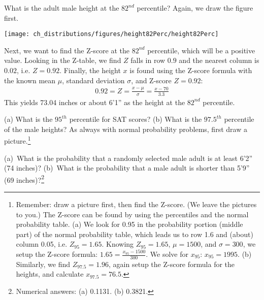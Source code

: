 \begin{example}{What is the adult male height at the $82^{nd}$ percentile?}
Again, we draw the figure first.\textC{\vspace{-3mm}}
\begin{center}
\texttt{[image: ch\_distributions/figures/height82Perc/height82Perc]}\textC{\vspace{-1mm}}
\end{center}
Next, we want to find the Z-score at the $82^{nd}$ percentile, which will be a positive value. Looking in the Z-table, we find $Z$ falls in row $0.9$ and the nearest column is $0.02$, i.e. $Z=0.92$. Finally, the height $x$ is found using the Z-score formula with the known mean $\mu$, standard deviation $\sigma$, and Z-score $Z=0.92$:
\begin{eqnarray*}
0.92 = Z = \frac{x-\mu}{\sigma} = \frac{x - 70}{3.3}
\end{eqnarray*}
This yields 73.04 inches or about 6'1'' as the height at the $82^{nd}$ percentile.
\end{example}

\begin{exercise}
(a) What is the $95^{th}$ percentile for SAT scores? (b) What is the $97.5^{th}$ percentile of the male heights? As always with normal probability problems, first draw a picture.\footnote{Remember: draw a picture first, then find the Z-score. (We leave the pictures to you.) The Z-score can be found by using the percentiles and the normal probability table. (a) We look for 0.95 in the probability portion (middle part) of the normal probability table, which leads us to row 1.6 and (about) column 0.05, i.e. $Z_{95}=1.65$. Knowing $Z_{95}=1.65$, $\mu = 1500$, and $\sigma = 300$, we setup the Z-score formula: $1.65 = \frac{x_{95} - 1500}{300}$. We solve for $x_{95}$: $x_{95} = 1995$. (b) Similarly, we find $Z_{97.5} = 1.96$, again setup the Z-score formula for the heights, and calculate $x_{97.5} = 76.5$.}
\end{exercise}

\begin{exercise}\label{more74Less69}
(a)~What is the probability that a randomly selected male adult is at least 6'2'' (74 inches)? (b)~What is the probability that a male adult is shorter than 5'9'' (69 inches)?\footnote{Numerical answers: (a) 0.1131. (b) 0.3821.}
\end{exercise}

